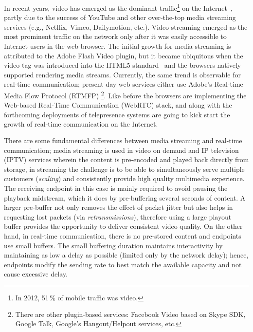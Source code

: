 In recent years, video has emerged as the dominant traffic\footnote{In 2012,
51\,\% of mobile traffic was video.} on the Internet~\cite{cvni.13,dawn.zb},
partly due to the success of YouTube and other over-the-top media streaming
services (e.g., Netflix, Vimeo, Dailymotion, etc.). Video streaming emerged as
the most prominent traffic on the network only after it was easily accessible
to Internet users in the web-browser. The initial growth for media streaming
is attributed to the Adobe Flash Video plugin, but it became ubiquitous when
the video tag was introduced into the HTML5 standard~\cite{html5-spec} and the
browsers natively supported rendering media streams. Currently, the same trend
is observable for real-time communication; present day web services either use
Adobe's Real-time Media Flow Protocol (RTMFP)
\cite{draft.rtmfp}\footnote{There are other  plugin-based services: Facebook
Video based on Skype SDK, Google Talk, Google's Hangout/Helpout services,
etc.}. Like before the browsers are implementing the Web-based Real-Time
Communication (WebRTC) stack, and along with the forthcoming deployments of
telepresence systems are going to kick start the growth of real-time
communication on the Internet.


There are some fundamental differences between media streaming and real-time
communication; media streaming is used in video on demand and IP television
(IPTV) services wherein the content is pre-encoded and played back directly
from storage, in streaming the challenge is to be able to simultaneously serve
multiple customers (\emph{scaling}) and consistently provide high quality
multimedia experience. The receiving endpoint in this case is mainly required
to avoid pausing the playback midstream, which it does by pre-buffering
several seconds of content. A larger pre-buffer not only removes the effect of
packet jitter but also helps in requesting lost packets (via
\emph{retransmissions}), therefore using a large playout buffer provides the
opportunity to deliver consistent video quality.
On the other hand, in real-time communication, there is no pre-stored content
and endpoints use small buffers. The small buffering duration maintains
interactivity by maintaining as low a delay as possible (limited only by the
network delay); hence, endpoints modify the sending rate to best match the
available capacity and not cause excessive delay.

